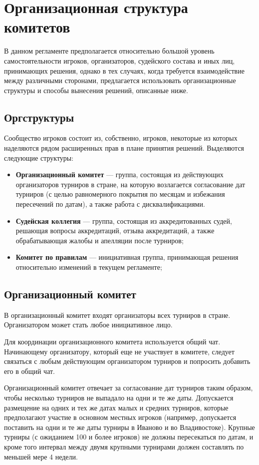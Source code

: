 \section{Организационная структура комитетов}

В данном регламенте предполагается относительно большой уровень самостоятельности игроков, организаторов, судейского состава и иных лиц, принимающих решения, однако в тех случаях, когда требуется взаимодействие между различными сторонами, предлагается использовать организационные структуры и способы вынесения решений, описанные ниже.

\subsection{Оргструктуры}

Сообщество игроков состоит из, собственно, игроков, некоторые из которых наделяются рядом расширенных прав в плане принятия решений. Выделяются следующие структуры:

\begin{itemize}
	\item \textbf{Организационный комитет} --- группа, состоящая из действующих организаторов турниров в стране, на которую возлагается согласование дат турниров (с целью равномерного покрытия по месяцам и избежания пересечений по датам), а также работа с дисквалификациями.
	\item \textbf{Судейская коллегия} --- группа, состоящая из аккредитованных судей, решающая вопросы аккредитаций, отзыва аккредитаций, а также обрабатывающая жалобы и апелляции после турниров;
	\item \textbf{Комитет по правилам} --- инициативная группа, принимающая решения относительно изменений в текущем регламенте;
\end{itemize}

\subsection{Организационный комитет}

В организационный комитет входят организаторы всех турниров в стране. Организатором может стать любое инициативное лицо.

Для координации организационного комитета используется общий чат. Начинающему организатору, который еще не участвует в комитете, следует связаться с любым действующим организатором турниров и попросить добавить его в общий чат.

Организационный комитет отвечает за согласование дат турниров таким образом, чтобы несколько турниров не выпадало на одни и те же даты. Допускается размещение на одних и тех же датах малых и средних турниров, которые предполагают участие в основном местных игроков (например, допускается поставить на одни и те же даты турниры в Иваново и во Владивостоке). Крупные турниры (с ожиданием 100 и более игроков) не должны пересекаться по датам, и кроме того интервал между двумя крупными турнирами должен составлять по меньшей мере 4 недели.

